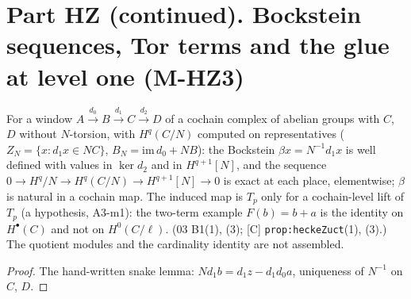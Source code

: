 
\chapter{Part HZ (continued). Bockstein sequences, Tor terms and the glue at level one (M-HZ3)}

\begin{lemma}[LB-1: the universal-coefficient sequence modulo $N=\ell^K$, elementary]\label{inf:heckez-uct}
  \leanok
  For a window $A\xrightarrow{d_0}B\xrightarrow{d_1}C\xrightarrow{d_2}D$ of a cochain complex of abelian groups with $C$, $D$ without
  $N$-torsion, with $H^q(C/N)$ computed on representatives ($Z_N=\{x:d_1x\in NC\}$, $B_N=\mathrm{im}\,d_0+NB$): the Bockstein
  $\beta x=N^{-1}d_1x$ is well defined with values in $\ker d_2$ and in $H^{q+1}[N]$, and the sequence
  $0\to H^q/N\to H^q(C/N)\to H^{q+1}[N]\to0$ is exact at each place, elementwise; $\beta$ is natural in a cochain map. The induced map is
  $T_p$ only for a cochain-level lift of $T_p$ (a hypothesis, A3-m1): the two-term example $F(b)=b+a$ is the identity on $H^\bullet(C)$ and not on
  $H^0(C/\ell)$. (03 B1(1), (3); [C] \texttt{prop:heckeZuct}(1), (3).) The quotient modules and the cardinality identity are not assembled.
\end{lemma}
\begin{proof}
  \leanok
  The hand-written snake lemma: $N d_1b=d_1z-d_1d_0a$, uniqueness of $N^{-1}$ on $C$, $D$.
\end{proof}

